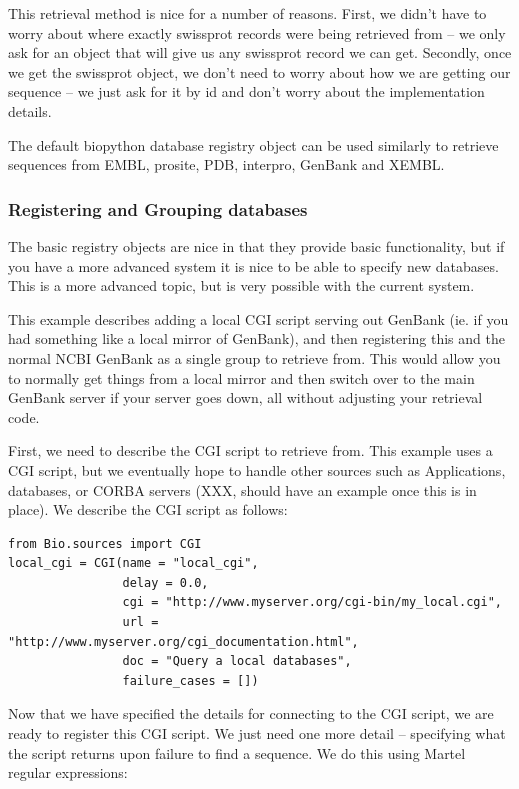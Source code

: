 \documentclass{report}
\begin{document}
This retrieval method is nice for a number of reasons. First, we didn't
have to worry about where exactly swissprot records were being retrieved
from -- we only ask for an object that will give us any swissprot record
we can get. Secondly, once we get the swissprot object, we don't need to
worry about how we are getting our sequence -- we just ask for it by id
and don't worry about the implementation details.

The default biopython database registry object can be used similarly to
retrieve sequences from EMBL, prosite, PDB, interpro, GenBank and XEMBL.

\subsubsection{Registering and Grouping databases}

The basic registry objects are nice in that they provide basic
functionality, but if you have a more advanced system it is nice to be
able to specify new databases. This is a more advanced topic, but is
very possible with the current system.

This example describes adding a local CGI script serving out GenBank
(ie. if you had something like a local mirror of GenBank), and then
registering this and the normal NCBI GenBank as a single group to
retrieve from. This would allow you to normally get things from a local
mirror and then switch over to the main GenBank server if your server
goes down, all without adjusting your retrieval code.

First, we need to describe the CGI script to retrieve from. This example
uses a CGI script, but we eventually hope to handle other sources such
as Applications, databases, or CORBA servers (XXX, should have an
example once this is in place). We describe the CGI script as follows:

\begin{verbatim}
from Bio.sources import CGI
local_cgi = CGI(name = "local_cgi",
                delay = 0.0,
                cgi = "http://www.myserver.org/cgi-bin/my_local.cgi",
                url = "http://www.myserver.org/cgi_documentation.html",
                doc = "Query a local databases",
                failure_cases = [])
\end{verbatim}

Now that we have specified the details for connecting to the CGI script,
we are ready to register this CGI script. We just need one more detail
-- specifying what the script returns upon failure to find a sequence.
We do this using Martel regular expressions:
\end{document}

